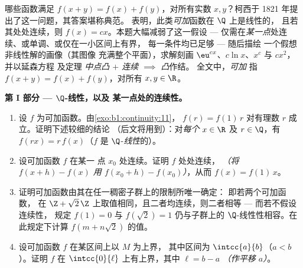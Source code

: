\begin{problem}[{周末问题 --- $f(x + y) = f(x) + f(y)$：
正则性导出线性，以及“怪物”的画像}]
\label{pb:b1:continuity:1}
哪些函数满足 $f(x + y) = f(x) + f(y)$，对所有实数 $x,
y$？柯西于 1821 年提出了这一问题，其答案堪称典范。
 表明，此类\emph{可加}函数在 $\Q$ 上是线性的，
且若其处处连续，则 $f(x)
= cx$。本题大幅减弱了这一假设 ---
仅需在\emph{某一点}处连续、或单调、或仅在一小区间上有界，
每一条件均已足够 --- 随后描绘
一个假想非线性解的画像（其图像
充满整个平面），求解刻画
$\eu^{cx}$、$c\ln x$、$x^c$ 与 $cx^2$，并以延森方程
及定理 \emph{中点凸 $+$ 连续
$\implies$ 凸}作结。
 全文中，\emph{可加}
指 $f(x + y) = f(x) + f(y)$，对所有 $x, y \in \R$。

\medskip
\noindent\textbf{第 I 部分 --- $\Q$-线性，以及
某一点处的连续性。}
\begin{enumerate}
  \item 设 $f$ 为可加函数。由\cref{exo:b1:continuity:11}，
        $f(r) = f(1)\,r$ 对有理数 $r$ 成立。证明下述较细的结论
        （后文将用到）：对\emph{每个} $x \in \R$ 及 $r
        \in \Q$，有 $f(rx) = r\,f(x)$（$f$ 是
        $\Q$-\emph{线性}的）。
  \item 设可加函数 $f$ 在某一
        点 $x_0$ 处连续。证明 $f$ 处处连续，
        \emph{（将 $f(x + h) - f(x)$ 用 $f(x_0 + h)
        - f(x_0)$）}，从而 $f(x) = f(1)\,x$。
  \item 证明可加函数由其在任一稠密子群上的限制所唯一确定：
        即若两个可加函数，
        在 $\Z + \sqrt2\,\Z$ 上取值相同，且二者均连续，则二者相等 ---
        而若不假设连续性，
        规定 $f(1) = 0$ 与 $f(\sqrt 2) = 1$ 仍与子群上的
        $\Q$-线性性相容。在此规定下计算 $f(m +
        n\sqrt2)$ 的值。
  \item 设可加函数 $f$ 在某区间上以 $M$ 为上界，
        其中区间为 $\intcc{a}{b}$（$a < b$）。证明 $f$ 在
        $\intcc{0}{\ell}$ 上有上界，其中 $\ell = b - a$
        \emph{（作平移 $a$）}。
\end{enumerate}


\end{problem}
